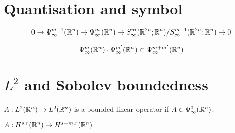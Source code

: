 \documentclass[12pt]{article}
\begin{document}
\section{Quantisation and symbol} 
\begin{flemma} 
    \begin{align*}
    0 \to \Psi^{m - 1}_{\infty}({\mathbb R}^n) \to \Psi^{m}_{\infty}({\mathbb R}^n) \to S^{m}_{\infty}({\mathbb R}^{2n}; {\mathbb R}^{n}) / S^{m - 1}_{\infty}({\mathbb R}^{2n}; {\mathbb R}^{n}) \to 0 
    \end{align*}
\end{flemma}

\begin{fprop}
    \begin{align*}
    \Psi^{m}_{\infty}({\mathbb R}^n) \cdot \Psi^{m'}_{\infty}({\mathbb R}^n) \subset \Psi^{m + m'}_{\infty}({\mathbb R}^n)
    \end{align*}
\end{fprop}

\section{$L^2$ and Sobolev boundedness} 
\begin{fprop}
    $A : L^2({\mathbb R}^n) \to L^2({\mathbb R}^n)$ is a bounded linear operator if $A \in \Psi^{0}_{\infty}({\mathbb R}^n)$. 
\end{fprop}


\begin{flemma}
    
\end{flemma}

\begin{fprop}
    $A: H^{s, r}({\mathbb R}^n) \to H^{s - m, r}({\mathbb R}^n)$
\end{fprop}
\end{document}
